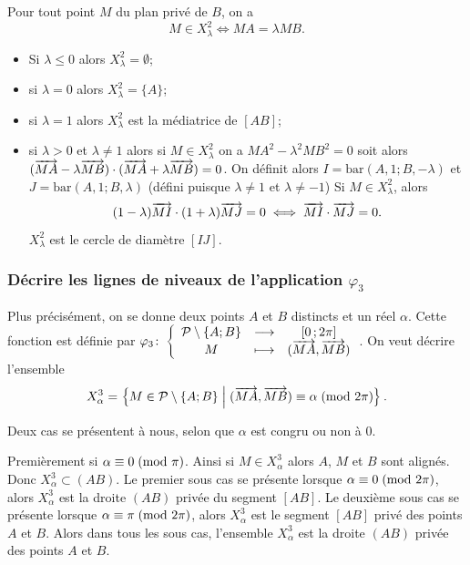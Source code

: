 Pour tout point \(M\) du plan privé de \(B\), on a
\begin{equation}
    M \in X_{\lambda}^2 \iff MA = \lambda MB.
\end{equation}

\begin{itemize}
    \item Si \(\lambda \leqslant 0\) alors \(X_{\lambda}^2 = \emptyset\);
    \item si \(\lambda = 0\) alors \(X_{\lambda}^2 = \{A\}\);
    \item si \(\lambda = 1\) alors \(X_{\lambda}^2\) est la médiatrice de 
        \([AB]\);
    \item si \(\lambda > 0\) et \(\lambda \neq 1\) alors si \(M \in 
        X_{\lambda}^2\) on a \(MA^2 - \lambda^2 MB^2 = 0\) soit alors 
        \((\overrightarrow{MA}-\lambda \overrightarrow{MB}) \cdot (\overrightarrow{MA} + \lambda \overrightarrow{MB}) = 
        0\). On définit alors \(I = \text{bar}(A , 1;B , -\lambda)\) et \(J = 
        \text{bar}(A , 1;B , \lambda)\) (défini puisque \(\lambda \neq 1\) et 
        \(\lambda \neq -1\))
        Si \(M \in X_{\lambda}^2\), alors
        \begin{equation}
        (1 - \lambda) \overrightarrow{MI} \cdot (1 + \lambda) \overrightarrow{MJ} = 0 \iff \overrightarrow{MI} 
    \cdot \overrightarrow{MJ} = 0.  \end{equation}
    \(X_{\lambda}^2\) est le cercle de diamètre \([IJ]\).
\end{itemize}

\subsubsection{Décrire les lignes de niveaux de l'application \(\varphi_3\)}

Plus précisément, on se donne deux points \(A\) et \(B\) distincts et un réel 
\(\alpha\). Cette fonction est définie par 
\(\varphi_3\colon \left\{\begin{array}{ccc} \mathcal{P}\setminus\{A;B\} & \longrightarrow &\left[ 0 \, ;  2\pi \right]\\ M & \longmapsto & (\overrightarrow{MA}, 
\overrightarrow{MB}) \end{array} \right.\). On veut décrire l'ensemble
\begin{equation}
    X_{\alpha}^3 = \left\{M \in 
    \mathcal{P}\setminus\{A;B\}\mathrel{}\middle|\mathrel{}(\overrightarrow{MA},\overrightarrow{MB}) \equiv \alpha\!\pmod {2\pi}\right\}.  
\end{equation}

Deux cas se présentent à nous, selon que \(\alpha\) est congru ou non à 0.

Premièrement si \(\alpha \equiv 0\!\pmod {\pi}\). Ainsi si \(M \in X_\alpha^3\) alors 
\(A\), \(M\) et \(B\) sont alignés. Donc \(X_\alpha^3 \subset (AB)\). Le premier 
sous cas se présente lorsque \(\alpha \equiv 0\!\pmod {2\pi}\), alors \(X_\alpha^3\) 
est la droite \((AB)\) privée du segment \([AB]\). Le deuxième sous cas se 
présente lorsque \(\alpha \equiv \pi\!\pmod {2\pi}\), alors  \(X_\alpha^3\) est le 
segment \([AB]\) privé des points \(A\) et \(B\).  Alors dans tous les sous cas, 
l'ensemble \(X_\alpha^3\) est la droite \((AB)\) privée des points \(A\) et 
\(B\).


